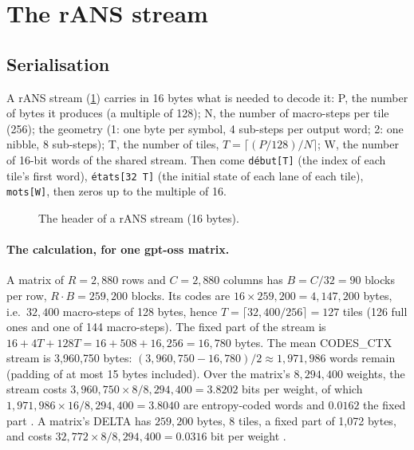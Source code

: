 \section{The rANS stream}\label{t2fmt:sec:rans}

\subsection{Serialisation}

A rANS stream (\cref{t2fmt:fig:flux-entete}) carries in 16 bytes what is needed to decode it: P, the number of bytes it produces (a multiple of 128); N, the number of macro-steps per tile (256); the geometry (1: one byte per symbol, 4 sub-steps per output word; 2: one nibble, 8 sub-steps); T, the number of tiles, $T = \lceil (P/128)/N \rceil$; W, the number of 16-bit words of the shared stream. Then come \texttt{début[T]} (the index of each tile's first word), \texttt{états[32\,T]} (the initial state of each lane of each tile), \texttt{mots[W]}, then zeros up to the multiple of 16.

\begin{figure}[ht]
\centering
\TdFmtFluxEntete
\caption[The header of a rANS stream]{The header of a rANS stream (16 bytes).}
\label{t2fmt:fig:flux-entete}
\end{figure}

\paragraph{The calculation, for one gpt-oss matrix.} A matrix of $R = 2{,}880$ rows and $C = 2{,}880$ columns has $B = C/32 = 90$ blocks per row, $R \cdot B = 259{,}200$ blocks. Its codes are $16 \times 259{,}200 = 4{,}147{,}200$ bytes, i.e.\ $32{,}400$ macro-steps of 128 bytes, hence $T = \lceil 32{,}400/256 \rceil = 127$ tiles (126 full ones and one of 144 macro-steps). The fixed part of the stream is $16 + 4T + 128T = 16 + 508 + 16{,}256 = 16{,}780$ bytes. The mean CODES\_CTX stream is 3{,}960{,}750 bytes: $(3{,}960{,}750 - 16{,}780)/2 \approx 1{,}971{,}986$ words remain (padding of at most 15 bytes included). Over the matrix's $8{,}294{,}400$ weights, the stream costs $3{,}960{,}750 \times 8 / 8{,}294{,}400 = 3.8202$ bits per weight, of which $1{,}971{,}986 \times 16 / 8{,}294{,}400 = 3.8040$ are entropy-coded words and $0.0162$ the fixed part \calc. A matrix's DELTA has $259{,}200$ bytes, 8 tiles, a fixed part of 1{,}072 bytes, and costs $32{,}772 \times 8 / 8{,}294{,}400 = 0.0316$ bit per weight \calc.

